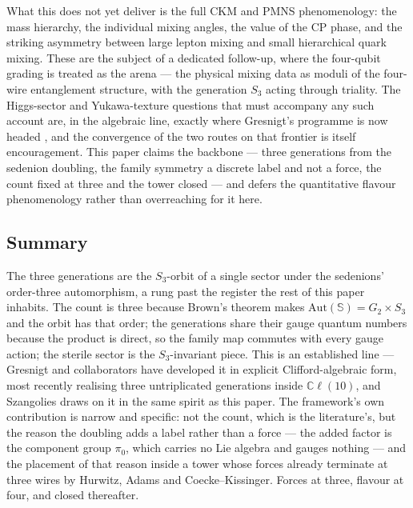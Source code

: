 What this does not yet deliver is the full CKM and PMNS phenomenology: the mass hierarchy, the
individual mixing angles, the value of the CP phase, and the striking asymmetry between large
lepton mixing and small hierarchical quark mixing. These are the subject of a dedicated follow-up, where the four-qubit
grading is treated as the arena --- the physical mixing data as moduli of the four-wire entanglement
structure, with the generation $S_3$ acting through triality. The Higgs-sector and Yukawa-texture
questions that must accompany any such account are, in the algebraic line, exactly where Gresnigt's
programme is now headed \autocite{gourlaygresnigt2024algebraic,gresnigt2026three}, and the convergence
of the two routes on that frontier is itself encouragement. This paper claims the backbone --- three
generations from the sedenion doubling, the family symmetry a discrete label and not a force, the
count fixed at three and the tower closed --- and defers the quantitative flavour phenomenology
rather than overreaching for it here.

\subsection{Summary}
\label{sec:sedenions-summary}

The three generations are the $S_3$-orbit of a single sector under the sedenions' order-three
automorphism, a rung past the register the rest of this paper inhabits. The count is three because
Brown's theorem makes $\mathrm{Aut}(\mathbb{S}) = G_2 \times S_3$ and the orbit has that order; the
generations share their gauge quantum numbers because the product is direct, so the family map
commutes with every gauge action; the sterile sector is the $S_3$-invariant piece. This is an established line --- Gresnigt and collaborators have
developed it in explicit Clifford-algebraic form, most recently realising three untriplicated
generations inside $\mathbb{C}\ell(10)$, and Szangolies draws on it in the same spirit as this paper.
The framework's own contribution is narrow and specific: not the count, which is the literature's, but
the reason the doubling adds a label rather than a force --- the added factor is the component group
$\pi_0$, which carries no Lie algebra and gauges nothing --- and the placement of that reason inside a
tower whose forces already terminate at three wires by Hurwitz, Adams and Coecke--Kissinger. Forces at
three, flavour at four, and closed thereafter.
